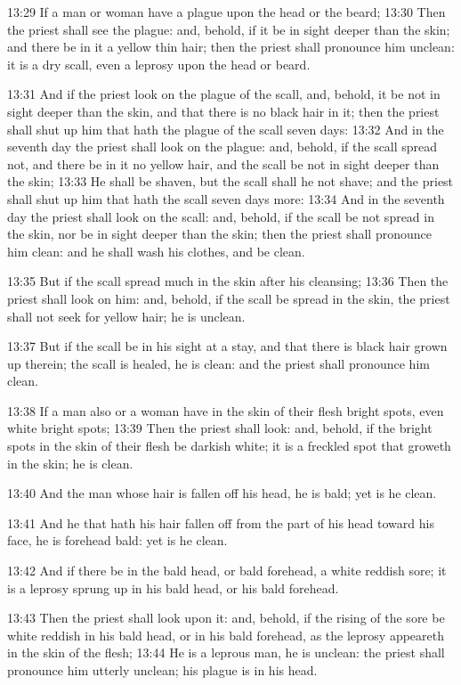 13:29 If a man or woman have a plague upon the head or the beard;
13:30 Then the priest shall see the plague: and, behold, if it be in
sight deeper than the skin; and there be in it a yellow thin hair;
then the priest shall pronounce him unclean: it is a dry scall, even a
leprosy upon the head or beard.

13:31 And if the priest look on the plague of the scall, and, behold,
it be not in sight deeper than the skin, and that there is no black
hair in it; then the priest shall shut up him that hath the plague of
the scall seven days: 13:32 And in the seventh day the priest shall
look on the plague: and, behold, if the scall spread not, and there be
in it no yellow hair, and the scall be not in sight deeper than the
skin; 13:33 He shall be shaven, but the scall shall he not shave; and
the priest shall shut up him that hath the scall seven days more:
13:34 And in the seventh day the priest shall look on the scall: and,
behold, if the scall be not spread in the skin, nor be in sight deeper
than the skin; then the priest shall pronounce him clean: and he shall
wash his clothes, and be clean.

13:35 But if the scall spread much in the skin after his cleansing;
13:36 Then the priest shall look on him: and, behold, if the scall be
spread in the skin, the priest shall not seek for yellow hair; he is
unclean.

13:37 But if the scall be in his sight at a stay, and that there is
black hair grown up therein; the scall is healed, he is clean: and the
priest shall pronounce him clean.

13:38 If a man also or a woman have in the skin of their flesh bright
spots, even white bright spots; 13:39 Then the priest shall look: and,
behold, if the bright spots in the skin of their flesh be darkish
white; it is a freckled spot that groweth in the skin; he is clean.

13:40 And the man whose hair is fallen off his head, he is bald; yet
is he clean.

13:41 And he that hath his hair fallen off from the part of his head
toward his face, he is forehead bald: yet is he clean.

13:42 And if there be in the bald head, or bald forehead, a white
reddish sore; it is a leprosy sprung up in his bald head, or his bald
forehead.

13:43 Then the priest shall look upon it: and, behold, if the rising
of the sore be white reddish in his bald head, or in his bald
forehead, as the leprosy appeareth in the skin of the flesh; 13:44 He
is a leprous man, he is unclean: the priest shall pronounce him
utterly unclean; his plague is in his head.

